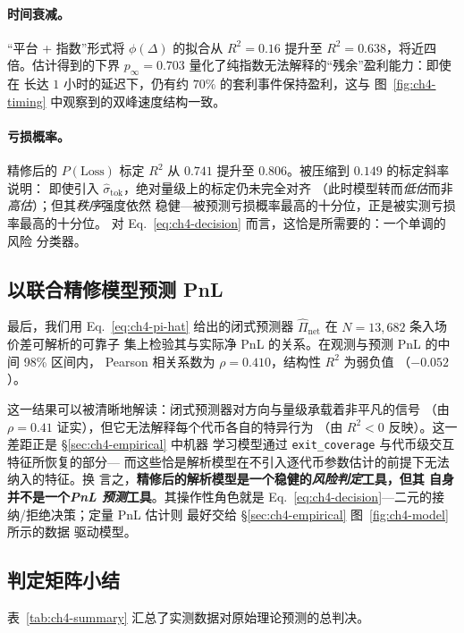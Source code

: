 \documentclass[sigconf,nonacm,10pt]{acmart}
\begin{document}
\paragraph{时间衰减。} “平台 + 指数”形式将 $\phi(\Delta)$ 的拟合从
$R^{2}\!=\!0.16$ 提升至 $R^{2}\!=\!0.638$，将近四倍。估计得到的下界
$p_{\infty}\!=\!0.703$ 量化了纯指数无法解释的“残余”盈利能力：即使在
长达 $1$ 小时的延迟下，仍有约 $70\%$ 的套利事件保持盈利，这与
图~\ref{fig:ch4-timing} 中观察到的双峰速度结构一致。

\paragraph{亏损概率。} 精修后的 $P(\text{Loss})$ 标定 $R^{2}$ 从
$0.741$ 提升至 $\mathbf{0.806}$。被压缩到 $0.149$ 的标定斜率说明：
即使引入 $\hat\sigma_{\text{tok}}$，绝对量级上的标定仍未完全对齐
（此时模型转而\emph{低估}而非\emph{高估}）；但其\emph{秩序}强度依然
稳健---被预测亏损概率最高的十分位，正是被实测亏损率最高的十分位。
对 Eq.~\eqref{eq:ch4-decision} 而言，这恰是所需要的：一个单调的风险
分类器。

\subsection{以联合精修模型预测 PnL}

最后，我们用 Eq.~\eqref{eq:ch4-pi-hat} 给出的闭式预测器
$\widehat{\Pi}_{\text{net}}$ 在 $N=13{,}682$ 条入场价差可解析的可靠子
集上检验其与实际净 PnL 的关系。在观测与预测 PnL 的中间 98\% 区间内，
Pearson 相关系数为 $\rho\!=\!0.410$，结构性 $R^{2}$ 为弱负值
（$-0.052$）。

这一结果可以被清晰地解读：闭式预测器对方向与量级承载着非平凡的信号
（由 $\rho\!=\!0.41$ 证实），但它无法解释每个代币各自的特异行为
（由 $R^{2}<0$ 反映）。这一差距正是 \S\ref{sec:ch4-empirical} 中机器
学习模型通过 \texttt{exit\_coverage} 与代币级交互特征所恢复的部分---
而这些恰是解析模型在不引入逐代币参数估计的前提下无法纳入的特征。换
言之，\textbf{精修后的解析模型是一个稳健的\emph{风险判定}工具，但其
自身并不是一个\emph{PnL 预测}工具}。其操作性角色就是
Eq.~\eqref{eq:ch4-decision}---二元的接纳/拒绝决策；定量 PnL 估计则
最好交给 \S\ref{sec:ch4-empirical} 图~\ref{fig:ch4-model} 所示的数据
驱动模型。

\subsection{判定矩阵小结}

表~\ref{tab:ch4-summary} 汇总了实测数据对原始理论预测的总判决。
\end{document}
